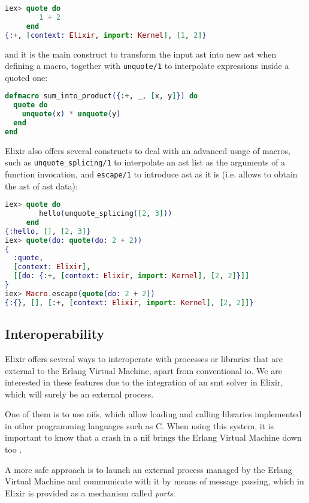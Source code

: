\begin{lstlisting}[language=elixir,numbers=none,frame=none]
iex> quote do 
        1 + 2
     end
{:+, [context: Elixir, import: Kernel], [1, 2]}
\end{lstlisting}

and it is the main construct to transform the input \gls{ast} into new \gls{ast}
when defining a macro, together with \verb|unquote/1| to interpolate expressions
inside a quoted one:

\begin{lstlisting}[language=elixir,numbers=none,frame=none]
defmacro sum_into_product({:+, _, [x, y]}) do
  quote do
    unquote(x) * unquote(y)
  end
end
\end{lstlisting}

Elixir also offers several constructs to deal with an advanced usage 
of macros, such as \verb|unquote_splicing/1| to interpolate an \gls{ast} list as 
the arguments of a function invocation, and \verb|escape/1| to introduce
\gls{ast} as it is (i.e. allows to obtain the \gls{ast} of \gls{ast} data):

\begin{lstlisting}[language=elixir,numbers=none,frame=none]
iex> quote do
        hello(unquote_splicing([2, 3]))
     end
{:hello, [], [2, 3]}
iex> quote(do: quote(do: 2 + 2))
{
  :quote, 
  [context: Elixir],
  [[do: {:+, [context: Elixir, import: Kernel], [2, 2]}]]
}
iex> Macro.escape(quote(do: 2 + 2))
{:{}, [], [:+, [context: Elixir, import: Kernel], [2, 2]]}
\end{lstlisting}

\subsection{Interoperability}

Elixir offers several ways to interoperate with processes or libraries that are
external to the Erlang Virtual Machine, apart from conventional \gls{io}. We are
interested in these features due to the integration of an \acrshort{smt} solver
in Elixir, which will surely be an external process.

One of them is to use \gls{nif}s, which allow loading and calling libraries
implemented in other programming languages such as C. When using this system,
it is important to know that a crash in a \gls{nif} brings the Erlang Virtual 
Machine down too \citep{ErlangDocs}.

A more safe approach is to launch an external process managed by the Erlang
Virtual Machine and communicate with it by means of message passing, which in 
Elixir is provided as a mechanism called \textit{ports}:

